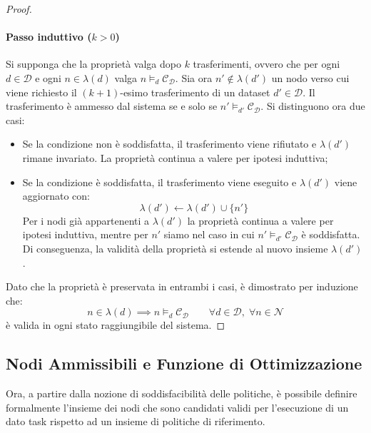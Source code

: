 \begin{theorem}
\begin{proof}
        \paragraph{Passo induttivo ($k > 0$)} Si supponga che la proprietà valga dopo $k$ trasferimenti, ovvero che per ogni $d \in \mathcal{D}$ e ogni $n \in \lambda(d)$ valga $n \models_d \mathcal{C_D}$. Sia ora $n' \notin \lambda(d')$ un nodo verso cui viene richiesto il $(k+1)$-esimo trasferimento di un dataset $d' \in \mathcal{D}$. Il trasferimento è ammesso dal sistema se e solo se $n' \models_{d'} \mathcal{C_D}$. Si distinguono ora due casi:
        \begin{itemize}
            \item  Se la condizione non è soddisfatta, il trasferimento viene rifiutato e $\lambda(d')$ rimane invariato. La proprietà continua a valere per ipotesi induttiva;
            \item Se la condizione è soddisfatta, il trasferimento viene eseguito e $\lambda(d')$ viene aggiornato con:
            \begin{equation}
                \lambda(d') \leftarrow \lambda(d') \cup \{n'\}
            \end{equation}
            Per i nodi già appartenenti a $\lambda(d')$ la proprietà continua a valere per ipotesi induttiva, mentre per $n'$ siamo nel caso in cui $n' \models_{d'} \mathcal{C_D}$ è soddisfatta. Di conseguenza, la validità della proprietà si estende al nuovo insieme $\lambda(d')$.
        \end{itemize}
        Dato che la proprietà è preservata in entrambi i casi, è dimostrato per induzione che:
        \begin{equation}
            n \in \lambda(d) \implies n \models_d \mathcal{C_D}
            \qquad 
            \forall d \in \mathcal{D}, \; \forall n \in \mathcal{N}
        \end{equation}
        è valida in ogni stato raggiungibile del sistema.
    \end{proof}
\end{theorem}


\subsection{Nodi Ammissibili e Funzione di Ottimizzazione}
\label{subsec:nodi_ammissibili_score}

Ora, a partire dalla nozione di soddisfacibilità delle politiche, è possibile definire formalmente l'insieme dei nodi che sono candidati validi per l'esecuzione di un dato task rispetto ad un insieme di politiche di riferimento.


